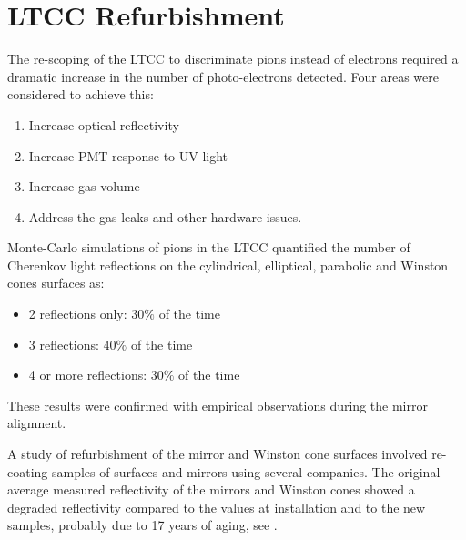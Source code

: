 \section{LTCC Refurbishment}


The re-scoping of the LTCC to discriminate pions instead of electrons required a dramatic increase in the
number of photo-electrons detected. Four areas were considered to achieve this:

\begin{enumerate}
	\item Increase optical reflectivity
	\item Increase PMT response to UV light
	\item Increase gas volume
	\item Address the gas leaks and other hardware issues.
\end{enumerate}


Monte-Carlo simulations of pions in the LTCC quantified the number of Cherenkov light  reflections on the cylindrical, elliptical,
parabolic and Winston cones surfaces as:

\begin{itemize}
	\item 2 reflections only: $30\%$ of the time
	\item 3 reflections: $40\%$ of the time
	\item 4 or more reflections: $30\%$ of the time
\end{itemize}

These results were confirmed with empirical observations during the mirror aligmnent.

A study of refurbishment of the mirror and Winston cone surfaces
involved re-coating samples of surfaces and mirrors using several companies.
The original average measured reflectivity of the mirrors and Winston cones
showed a degraded reflectivity compared to the values at installation and to
the new samples, probably due to  17 years of aging, see .


